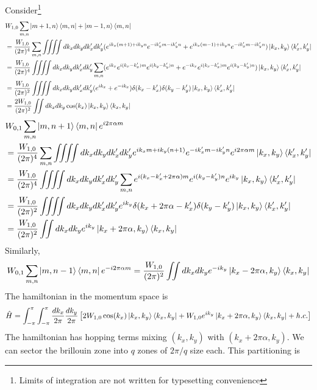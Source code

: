 Consider\footnote{Limits of integration are not written for typesetting convenience}
\begin{align*}
 &W_{1,0} \sum_{m, n} \ket{m+1,n}\bra{m,n} + \ket{m-1,n}\bra{m,n}\nonumber\\ 
 &= \frac{W_{1,0}}{(2\pi)^4}\sum_{m,n}\iiiint dk_{x}dk_{y}dk_{x}'dk_{y}'(e^{ik_x(m+1)+ik_yn}e^{-ik_x'm-ik_y'n} + e^{ik_x(m-1)+ik_yn}e^{-ik_x'm-ik_y'n})\ket{k_x,k_y}\bra{k_{x}',k_{y}'} \nonumber\\
 &= \frac{W_{1,0}}{(2\pi)^4}\iiiint dk_{x}dk_{y}dk_{x}'dk_{y}'\sum_{m,n}(e^{ik_x}e^{i(k_x-k_x')m}e^{i(k_y-k_y')n} + e^{-ik_x}e^{i(k_x-k_x')m}e^{i(k_y-k_y')n})\ket{k_x,k_y}\bra{k_{x}',k_{y}'} \nonumber \\
 &=\frac{W_{1,0}}{(2\pi)^2}\iiiint dk_{x}dk_{y}dk_{x}'dk_{y}'(e^{ik_x}+e^{-ik_x}) \delta(k_x-k_x') \delta(k_y-k_y')\ket{k_x,k_y}\bra{k_{x}',k_{y}'} \nonumber \\
 &= \frac{2W_{1,0}}{(2\pi)^2} \iint dk_{x}dk_{y} \cos(k_x)\ket{k_x,k_y}\bra{k_{x},k_{y}}
\end{align*}
\begin{align*}
 &W_{0,1} \sum_{m, n}\ket{m, n+1}\bra{m, n} e^{i2\pi\alpha m} \\
 &= \frac{W_{1,0}}{(2\pi)^4}\sum_{m,n}\iiiint dk_{x}dk_{y}dk_{x}'dk_{y}'e^{ik_xm+ik_y(n+1)}e^{-ik_x'm-ik_y'n}e^{i2\pi\alpha m}\ket{k_x,k_y}\bra{k_{x}',k_{y}'}\\
 &= \frac{W_{1,0}}{(2\pi)^4}\iiiint dk_{x}dk_{y}dk_{x}'dk_{y}'\sum_{m,n}e^{i(k_x-k_x'+2\pi\alpha)m}e^{i(k_y-k_y')n}e^{ik_y}\ket{k_x,k_y}\bra{k_{x}',k_{y}'}\\
 &= \frac{W_{1,0}}{(2\pi)^2}\iiiint dk_{x}dk_{y}dk_{x}'dk_{y}' e^{ik_y} \delta(k_x+2\pi\alpha-k_x') \delta(k_y-k_y')\ket{k_x,k_y}\bra{k_{x}',k_{y}'}\\
 &= \frac{W_{1,0}}{(2\pi)^2}\iint dk_{x}dk_{y} e^{ik_y}\ket{k_x+2\pi\alpha,k_y}\bra{k_{x},k_{y}}\\
\end{align*}
Similarly,
\begin{equation*}
 W_{0,1} \sum_{m, n}\ket{m, n-1}\bra{m, n} e^{-i2\pi\alpha m} = \frac{W_{1,0}}{(2\pi)^2}\iint dk_{x}dk_{y} e^{-ik_y}\ket{k_x-2\pi\alpha,k_y}\bra{k_{x},k_{y}}
\end{equation*}
The hamiltonian in the momentum space is 
\begin{equation}
 \hat{H} = \int_{-\pi}^{\pi}\int_{-\pi}^{\pi}{\frac{dk_{x}}{2\pi}\frac{dk_{y}}{2\pi} \left[ 2W_{1,0}\cos(k_{x}) \ket{k_x,k_y}\bra{k_{x},k_{y}} + W_{1,0}e^{ik_y}\ket{k_x+2\pi\alpha,k_y}\bra{k_{x},k_{y}} + h.c.\right]}
\end{equation} The hamiltonian has hopping terms mixing $(k_x, k_y)$ with $(k_x + 2\pi\alpha, k_y)$. We can sector the brillouin zone into $q$ zones of $2\pi/q$ size each. This partitioning is
